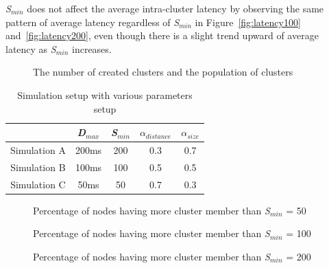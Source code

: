 \textit{S$_{min}$} does not affect the average intra-cluster latency by
observing the same pattern of average latency regardless of
\textit{S$_{min}$} in Figure~\ref{fig:latency100}
and~\ref{fig:latency200}, even though there is a slight trend upward of
average latency as \textit{S$_{min}$} increases.
%
\begin{figure}
\centering
{}
\caption{The number of created clusters and the population of clusters}
\label{fig:population}
\end{figure}
%
\begin{table}
\centering
\caption{Simulation setup with various parameters setup}
	\begin{tabular}{c|c|c|c|c}
	\hline
	\ & \textit{D$_{max}$} & \textit{S$_{min}$} & $\alpha$$_{distance}$ &
$\alpha$$_{size}$ \\
	\hline
	Simulation A & 200ms & 200 & 0.3 & 0.7 \\
	Simulation B & 100ms & 100 & 0.5 & 0.5 \\
	Simulation C & 50ms & 50 & 0.7 & 0.3 \\
	\hline
	\end{tabular}
\label{table:simulation_setup}
\end{table}
%
\begin{figure}
\centering
{}
\caption{Percentage of nodes having more cluster member than \textit{S$_{min}$} = 50}
\label{fig:population50}
\end{figure}
%
\begin{figure}
\centering
{}
\caption{Percentage of nodes having more cluster member than
\textit{S$_{min}$} = 100}
\label{fig:population100}
\end{figure}
%
\begin{figure}
\centering
{}
\caption{Percentage of nodes having more cluster member than
\textit{S$_{min}$} = 200}
\label{fig:population200}
\end{figure}

